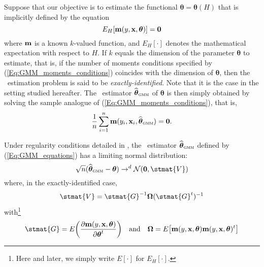 Suppose that our objective is to estimate the functional $\boldsymbol\theta =
\boldsymbol\theta(H)$ that is implicitly defined by the equation
%
\begin{equation}
    \label{Eq:GMM_moments_conditions}
    E_H[\mathbf m(y, \mathbf x, \boldsymbol\theta)] = \mathbf 0
\end{equation}
%
where $\mathbf m$ is a known $k$-valued function, and $E_H[\cdot]$ denotes the
mathematical expectation with respect to $H$. If $k$ equals the dimension of
the parameter $\boldsymbol\theta$ to estimate, that is, if the number of
moments conditions specified by (\ref{Eq:GMM_moments_conditions}) coincides
with the dimension of $\boldsymbol\theta$, then the ~estimation
problem is said to be \emph{exactly-identified}. Note that it is the case in
the setting studied hereafter. The ~estimator
$\sthat{\boldsymbol\theta}_\stsc{GMM}$ of $\boldsymbol\theta$ is then simply
obtained by solving the sample analogue of (\ref{Eq:GMM_moments_conditions}),
that is,
%
\begin{equation}
    \label{Eq:GMM_equations}
    \frac{1}{n} \sum_{i=1}^{n} \stvec{m}(y_i, \stvec{x}_i, 
    \sthat{\boldsymbol\theta}_\stsc{GMM}) = \stvec{0}.
\end{equation}

Under regularity conditions detailed in \citet{Hansen:1982}, the 
~estimator $\sthat{\boldsymbol\theta}_\stsc{GMM}$ defined by
(\ref{Eq:GMM_equations}) has a limiting normal distribution:
%
\begin{equation}
    \label{Eq:GMM_estimator_normality}
    \sqrt{n}(\sthat{\boldsymbol\theta}_\stsc{GMM} - \boldsymbol\theta)
    \rightarrow^d \mathcal{N}(\stvec{0},\stmat{V})
\end{equation}
%
where, in the exactly-identified case,
%
\begin{equation}
    \label{Eq:GMM_estimator_V}
    \stmat{V} = \stmat{G}^{-1} \boldsymbol\Omega (\stmat{G}^t)^{-1}
\end{equation}
%
with\footnote{Here and later, we simply write $E[\cdot]$ for $E_H[\cdot]$.}
%
\begin{equation}
    \label{Eq:GMM_estimator_G_Omega}
    \stmat{G} = E\left(\frac{\partial\stvec{m}(y, \stvec{x}, \boldsymbol\theta)}
                            {\partial\boldsymbol\theta^t}\right)
    \quad\text{and}\quad
    \boldsymbol\Omega = E\left[\stvec{m}(y,\stvec{x},\boldsymbol\theta)
                        \stvec{m}(y,\stvec{x},\boldsymbol\theta)^t\right]
\end{equation}


